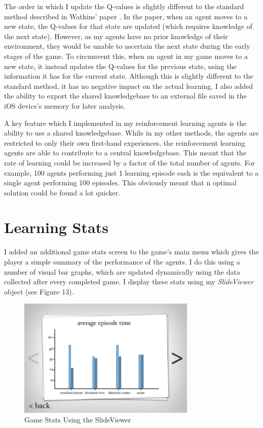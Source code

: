 \documentclass[a4paper,oneside]{report}
\begin{document}
The order in which I update the Q-values is slightly different to the standard method described in Watkins' paper \cite{Watkins:1989mi}. In the paper, when an agent moves to a new state, the Q-values for that state are updated (which requires knowledge of the next state). However, as my agents have no prior knowledge of their environment, they would be unable to ascertain the next state during the early stages of the game. To circumvent this, when an agent in my game moves to a new state, it instead updates the Q-values for the previous state, using the information it has for the current state. Although this is slightly different to the standard method, it has no negative impact on the actual learning. I also added the ability to export the shared knowledgebase to an external file saved in the iOS device's memory for later analysis.

A key feature which I implemented in my reinforcement learning agents is the ability to use a shared knowledgebase. While in my other methods, the agents are restricted to only their own first-hand experiences, the reinforcement learning agents are able to contribute to a central knowledgebase. This meant that the rate of learning could be increased by a factor of the total number of agents. For example, 100 agents performing just 1 learning episode each is the equivalent to a single agent performing 100 episodes. This obviously meant that n optimal solution could be found a lot quicker.

\section{Learning Stats}

I added an additional game stats screen to the game's main menu which gives the player a simple summary of the performance of the agents. I do this using a number of visual bar graphs, which are updated dynamically using the data collected after every completed game. I display these stats using my \emph{SlideViewer} object (see Figure 13).

\begin{figure}
  \centering
    \includegraphics[width=85mm]{sources/images/GraphSlide}
    \caption{Game Stats Using the SlideViewer}
\end{figure}
\end{document}
